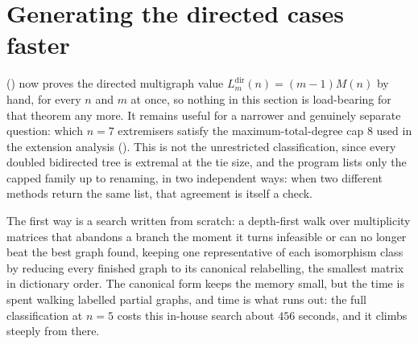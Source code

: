 \section{Generating the directed cases faster}
 () now proves the directed multigraph value $L_m^{\mathrm{dir}}(n) = (m-1)M(n)$ by hand, for every $n$ and $m$ at once, so nothing in this section is load-bearing for that theorem any more. It remains useful for a narrower and genuinely separate question: which $n=7$ extremisers satisfy the maximum-total-degree cap $8$ used in the extension analysis (). This is not the unrestricted classification, since every doubled bidirected tree is extremal at the tie size, and the program lists only the capped family up to renaming, in two independent ways: when two different methods return the same list, that agreement is itself a check.

The first way is a search written from scratch: a depth-first walk over multiplicity matrices that abandons a branch the moment it turns infeasible or can no longer beat the best graph found, keeping one representative of each isomorphism class by reducing every finished graph to its canonical relabelling, the smallest matrix in dictionary order. The canonical form keeps the memory small, but the time is spent walking labelled partial graphs, and time is what runs out: the full classification at $n = 5$ costs this in-house search about $456$ seconds, and it climbs steeply from there.

